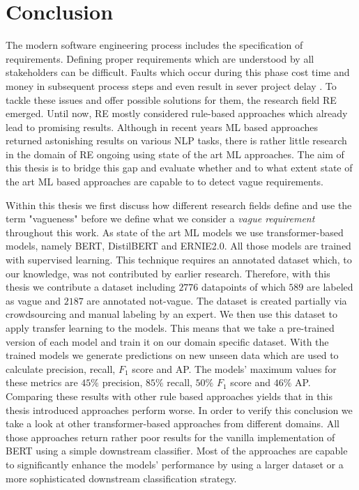 \chapter{Conclusion}
\label{chp:conclusion}
The modern software engineering process includes the specification of requirements.
Defining proper requirements which are understood by all stakeholders can be difficult.
Faults which occur during this phase cost time and money in subsequent process steps \parencite{Mendez:2016} and even result in sever project delay \parencite{Femmer:2014}.
To tackle these issues and offer possible solutions for them, the research field \ac{RE} emerged.
Until now, \ac{RE} mostly considered rule-based approaches which already lead to promising results.
Although in recent years \ac{ML} based approaches returned astonishing results on various \ac{NLP} tasks, there is rather little research in the domain of \ac{RE} ongoing using state of the art \ac{ML} approaches.
The aim of this thesis is to bridge this gap and evaluate whether and to what extent state of the art \ac{ML} based approaches are capable to to detect vague requirements.

Within this thesis we first discuss how different research fields define and use the term "vagueness" before we define what we consider a \textit{vague requirement} throughout this work.
As state of the art \ac{ML} models we use transformer-based models, namely \ac{BERT}, \ac{DistilBERT} and \ac{ERNIE2.0}.
All those models are trained with supervised learning.
This technique requires an annotated dataset which, to our knowledge, was not contributed by earlier research.
Therefore, with this thesis we contribute a dataset including $2776$ datapoints of which $589$ are labeled as vague and $2187$ are annotated not-vague.
The dataset is created partially via crowdsourcing and manual labeling by an expert.
We then use this dataset to apply transfer learning to the models.
This means that we take a pre-trained version of each model and train it on our domain specific dataset.
With the trained models we generate predictions on new unseen data which are used to calculate precision, recall, $F_1$ score and \ac{AP}.
The models' maximum values for these metrics are $45\%$ precision, $85\%$ recall, $50\%$ $F_1$ score and $46\%$ \ac{AP}.
Comparing these results with other rule based approaches yields that in this thesis introduced approaches perform worse.
In order to verify this conclusion we take a look at other transformer-based approaches from different domains.
All those approaches return rather poor results for the vanilla implementation of \ac{BERT} using a simple downstream classifier.
Most of the approaches are capable to significantly enhance the models' performance by using a larger dataset or a more sophisticated downstream classification strategy.

